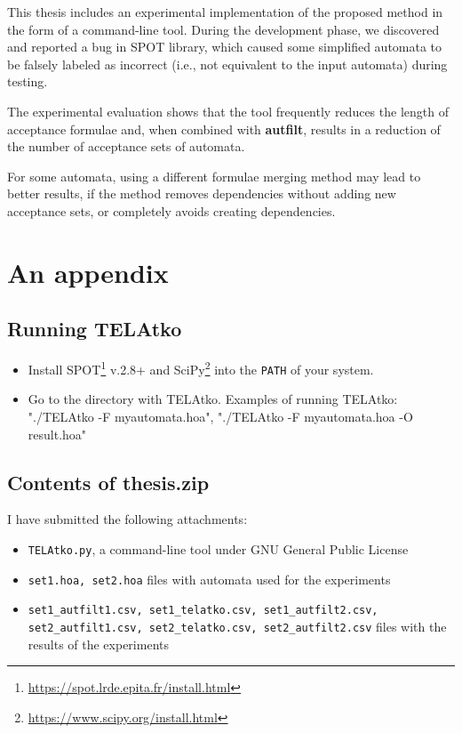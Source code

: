 \documentclass[
  digital, %
  twoside, %
  table,   %
  lof,     %
  lot,     %
]{fithesis3}
\begin{document}
This thesis includes an experimental implementation of the proposed method in the form of a command-line tool. During the development phase, we discovered and reported a bug in SPOT library, which caused some simplified automata to be falsely labeled as incorrect (i.e., not equivalent to the input automata) during testing.

The experimental evaluation shows that the tool frequently reduces the length of acceptance formulae and, when combined with \textbf{autfilt}, results in a reduction of the number of acceptance sets of automata.

For some automata, using a different formulae merging method may lead to better results, if the method removes dependencies without adding new acceptance sets, or completely avoids creating dependencies. 

\printbibliography[heading=bibintoc]

\appendix
\chapter{An appendix}
\section{Running TELAtko}
\begin{itemize}
  \item Install SPOT\footnote{\url{https://spot.lrde.epita.fr/install.html}} v.2.8+ and SciPy\footnote{\url{https://www.scipy.org/install.html}} into the \texttt{PATH} of your system.
  \item Go to the directory with TELAtko. Examples of running TELAtko: "./TELAtko -F myautomata.hoa", "./TELAtko -F myautomata.hoa -O result.hoa"
\end{itemize}
\section{Contents of thesis.zip}
I have submitted the following attachments:
\begin{itemize}
  \item \texttt{TELAtko.py}, a command-line tool under GNU General Public License
  \item \texttt{set1.hoa, set2.hoa} files with automata used for the experiments
  \item \texttt{set1\_autfilt1.csv, set1\_telatko.csv, set1\_autfilt2.csv, set2\_autfilt1.csv, set2\_telatko.csv, set2\_autfilt2.csv} files with the results of the experiments
\end{itemize}
\end{document}
